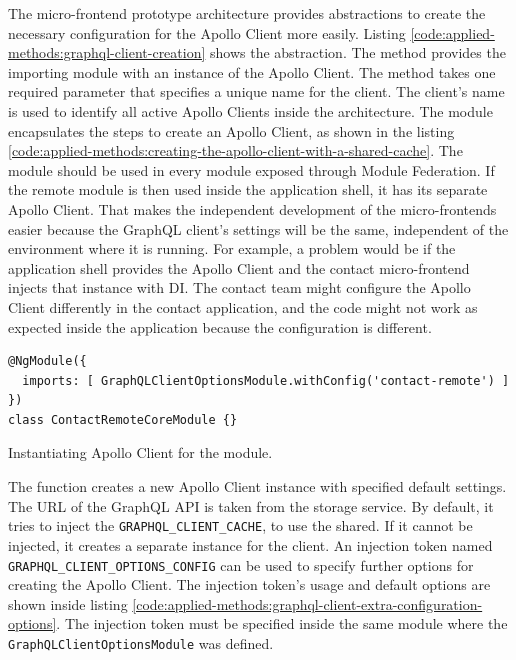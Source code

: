 \noindent The micro-frontend prototype architecture provides abstractions to create the necessary configuration for the Apollo Client more easily. Listing \ref{code:applied-methods:graphql-client-creation} shows the abstraction. The method provides the importing module with an instance of the Apollo Client. The method takes one required parameter that specifies a unique name for the client. The client's name is used to identify all active Apollo Clients inside the architecture. The module encapsulates the steps to create an Apollo Client, as shown in the listing \ref{code:applied-methods:creating-the-apollo-client-with-a-shared-cache}. The module should be used in every module exposed through Module Federation. If the remote module is then used inside the application shell, it has its separate Apollo Client. That makes the independent development of the micro-frontends easier because the GraphQL client's settings will be the same, independent of the environment where it is running. For example, a problem would be if the application shell provides the Apollo Client and the contact micro-frontend injects that instance with \ac{DI}. The contact team might configure the Apollo Client differently in the contact application, and the code might not work as expected inside the application because the configuration is different.

\ifshowListings
  \begin{listing}[H]
    \begin{verbatim}
@NgModule({
  imports: [ GraphQLClientOptionsModule.withConfig('contact-remote') ]
})
class ContactRemoteCoreModule {}
    \end{verbatim}
  \caption{Instantiating Apollo Client for the module.}\label{code:applied-methods:graphql-client-creation}
  \end{listing}
\fi

\noindent The function creates a new Apollo Client instance with specified default settings. The \ac{URL} of the GraphQL \ac{API} is taken from the storage service. By default, it tries to inject the \texttt{GRAPHQL\_CLIENT\_CACHE}, to use the shared. If it cannot be injected, it creates a separate instance for the client. An injection token named \texttt{GRAPHQL\_CLIENT\_OPTIONS\_CONFIG} can be used to specify further options for creating the Apollo Client. The injection token's usage and default options are shown inside listing \ref{code:applied-methods:graphql-client-extra-configuration-options}. The injection token must be specified inside the same module where the \texttt{GraphQLClientOptionsModule} was defined.

